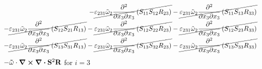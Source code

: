 \begin{equation}
\begin{split}
		-\cancel{\varepsilon_{231}\tilde{\omega}_{2}\pdv{}{x_{3}}{x_{3}}\left(S_{11}S_{12}R_{23}\right)}
		-\cancel{\varepsilon_{231}\tilde{\omega}_{2}\pdv{}{x_{3}}{x_{3}}\left(S_{11}S_{13}R_{33}\right)}\\
		-\cancel{\varepsilon_{231}\tilde{\omega}_{2}\pdv{}{x_{3}}{x_{3}}\left(S_{12}S_{21}R_{13}\right)}
		-\cancel{\varepsilon_{231}\tilde{\omega}_{2}\pdv{}{x_{3}}{x_{3}}\left(S_{12}S_{22}R_{23}\right)}
		-\cancel{\varepsilon_{231}\tilde{\omega}_{2}\pdv{}{x_{3}}{x_{3}}\left(S_{12}S_{23}R_{33}\right)}\\
		-\cancel{\varepsilon_{231}\tilde{\omega}_{2}\pdv{}{x_{3}}{x_{3}}\left(S_{13}S_{31}R_{13}\right)}
		-\cancel{\varepsilon_{231}\tilde{\omega}_{2}\pdv{}{x_{3}}{x_{3}}\left(S_{13}S_{32}R_{23}\right)}
		-\cancel{\varepsilon_{231}\tilde{\omega}_{2}\pdv{}{x_{3}}{x_{3}}\left(S_{13}S_{33}R_{33}\right)}\\
	\end{split}
\end{equation}
$-\mathbf{\tilde{\omega}}\cdot\curl \div \mathbf{S}^2 \mathbf{R}$ for $i=3$
